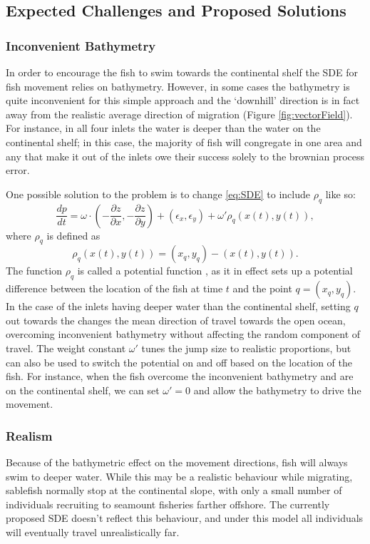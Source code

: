 \documentclass{article}
\begin{document}
\subsection{Expected Challenges and Proposed Solutions}

\subsubsection*{Inconvenient Bathymetry}

In order to encourage the fish to swim towards the continental shelf the SDE for fish movement relies on bathymetry. However, in some cases the bathymetry is quite inconvenient for this simple approach and the `downhill' direction is in fact away from the realistic average direction of migration (Figure \ref{fig:vectorField}). For instance, in all four inlets the water is deeper than the water on the continental shelf; in this case, the majority of fish will congregate in one area and any that make it out of the inlets owe their success solely to the brownian process error.

One possible solution to the problem is to change \eqref{eq:SDE} to include $\rho_q$ like so:
\[
\frac{dp}{dt} = \omega \cdot \left( - \frac{\partial z}{\partial x}, - \frac{\partial z}{\partial y} \right) + (\epsilon_x, \epsilon_y) + \omega' \rho_{q} ( x(t), y(t) ),
\]
where $\rho_q$ is defined as
\[
  \rho_q ( x(t), y(t) ) = (x_q, y_q) - (x(t), y(t) ).
\]
The function $\rho_q$ is called a potential function \citep{brillinger2001use}, as it in effect sets up a potential difference between the location of the fish at time $t$ and the point $q = (x_q, y_q)$. In the case of the inlets having deeper water than the continental shelf, setting $q$ out towards the changes the mean direction of travel towards the open ocean, overcoming inconvenient bathymetry without affecting the random component of travel. The weight constant $\omega'$ tunes the jump size to realistic proportions, but can also be used to switch the potential on and off based on the location of the fish. For instance, when the fish overcome the inconvenient bathymetry and are on the continental shelf, we can set $\omega' = 0$ and allow the bathymetry to drive the movement.

\subsubsection*{Realism}

Because of the bathymetric effect on the movement directions, fish will always swim to deeper water. While this may be a realistic behaviour while migrating, sablefish normally stop at the continental slope, with only a small number of individuals recruiting to seamount fisheries farther offshore. The currently proposed SDE doesn't reflect this behaviour, and under this model all individuals will eventually travel unrealistically far. 
\end{document}
